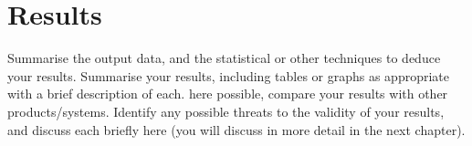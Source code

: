 \section{Results}
Summarise the output data, and the statistical or other techniques to deduce your results. Summarise your results, including tables or graphs as appropriate with a brief description of each. here possible, compare your results with other products/systems. Identify any possible threats to the validity of your results, and discuss each briefly here (you will discuss in more detail in the next chapter).